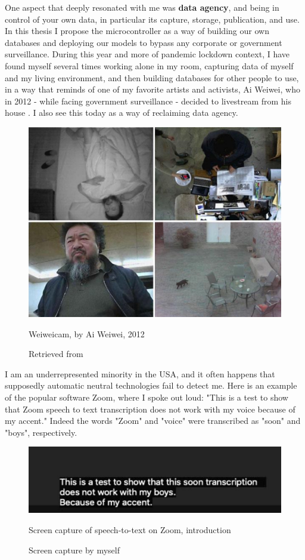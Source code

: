 One aspect that deeply resonated with me was \textbf{data agency}, and being in control of your own data, in particular its capture, storage, publication, and use. In this thesis I propose the microcontroller as a way of building our own databases and deploying our models to bypass any corporate or government surveillance. During this year and more of pandemic lockdown context, I have found myself several times working alone in my room, capturing data of myself and my living environment, and then building databases for other people to use, in a way that reminds of one of my favorite artists and activists, Ai Weiwei, who in 2012 - while facing government surveillance - decided to livestream from his house \cite{website-forbes-ai-weiwei-cam}. I also see this today as a way of reclaiming data agency.

\begin{figure}[ht]
  \centering
  \includegraphics[width=0.75\linewidth,height=0.30\textheight,keepaspectratio]{images/weiweicam.jpg}
  \caption{Weiweicam, by Ai Weiwei, 2012}
  \caption*{Retrieved from \cite{website-forbes-ai-weiwei-cam}}
  \label{fig:weiweicam}
\end{figure}

I am an underrepresented minority in the USA, and it often happens that supposedly automatic neutral technologies fail to detect me. Here is an example of the popular software Zoom, where I spoke out loud: "This is a test to show that Zoom speech to text transcription does not work with my voice because of my accent." Indeed the words "Zoom" and "voice" were transcribed as "soon" and "boys", respectively.

\begin{figure}[ht]
  \centering
  \includegraphics[width=0.75\linewidth,height=0.25\textheight,keepaspectratio]{images/zoom-introduction.jpg}
  \caption{Screen capture of speech-to-text on Zoom, introduction}
  \caption*{Screen capture by myself}
  \label{fig:zoom-voice}
\end{figure}

